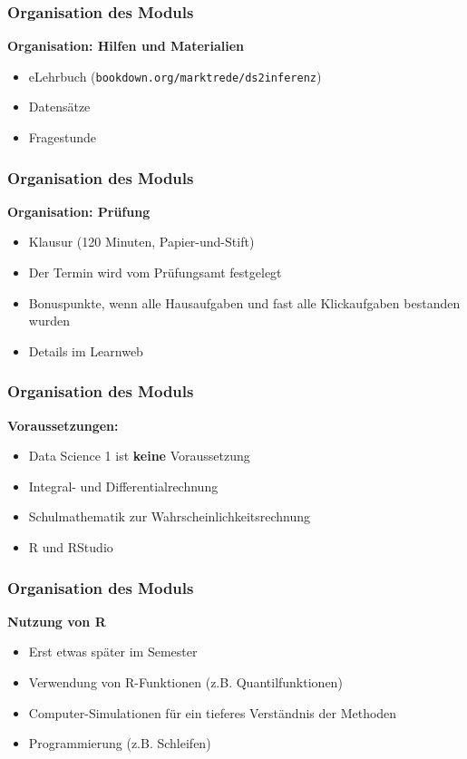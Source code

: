 \documentclass[12pt,show notes]{beamer}
\begin{document}
\begin{frame}
\frametitle{Organisation des Moduls}
\textbf{Organisation: Hilfen und Materialien}\medskip
\begin{itemize}
\item eLehrbuch (\texttt{bookdown.org/marktrede/ds2inferenz})
\item Datensätze
\item Fragestunde 
\end{itemize}
\end{frame}

\begin{frame}
\frametitle{Organisation des Moduls}
\textbf{Organisation: Prüfung}\medskip
\begin{itemize}
\item Klausur (120 Minuten, Papier-und-Stift)
\item Der Termin wird vom Prüfungsamt festgelegt
\item Bonuspunkte, wenn alle Hausaufgaben und fast alle Klickaufgaben 
bestanden wurden
\item Details im Learnweb
\end{itemize}
\end{frame}

\begin{frame}
\frametitle{Organisation des Moduls}
\textbf{Voraussetzungen:}\medskip
\begin{itemize}
\item Data Science 1 ist \textbf{keine} Voraussetzung
\item Integral- und Differentialrechnung
\item Schulmathematik zur Wahrscheinlichkeitsrechnung
\item R und RStudio
\end{itemize}
\end{frame}

\begin{frame}
\frametitle{Organisation des Moduls}
\textbf{Nutzung von R}\medskip
\begin{itemize}
\item Erst etwas später im Semester
\item Verwendung von R-Funktionen (z.B. Quantilfunktionen)
\item Computer-Simulationen für ein tieferes Verständnis der Methoden
\item Programmierung (z.B. Schleifen)
\end{itemize}
\end{frame}
\end{document}

